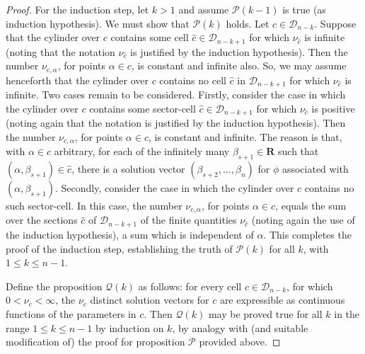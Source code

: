 \documentclass[10pt,a4paper]{amsart}
\def\R{\mathbf{ R}}
\begin{document}
\begin{proof}
    For the induction step, let $k > 1$ and assume $\mathcal{P}(k-1)$ is true
    (as induction hypothesis). We must show that $\mathcal{P}(k)$ holds.
    Let $c \in \mathcal{D}_{n-k}$.
    Suppose that the cylinder over $c$ contains some 
    cell $\hat{c} \in \mathcal{D}_{n-k+1}$ for which $\nu_{\hat{c}}$
    is infinite (noting that the notation $\nu_{\hat{c}}$
    is justified by the induction hypothesis).
    Then the number $\nu_{c, \alpha}$, for points $\alpha \in c$,
    is constant and infinite also.
    So, we may assume henceforth that the cylinder over $c$ contains
    no cell $\hat{c}$ in $\mathcal{D}_{n-k+1}$ for which $\nu_{\hat{c}}$
    is infinite. Two cases remain to be considered.
    Firstly, consider the case in which the cylinder over $c$
    contains some sector-cell $\hat{c} \in \mathcal{D}_{n-k+1}$
    for which $\nu_{\hat{c}}$ is positive
    (noting again that the notation is justified by the induction
    hypothesis). Then the number $\nu_{c, \alpha}$, for points
    $\alpha \in c$, is constant and infinite. The reason is that,
    with $\alpha \in c$ arbitrary,
    for each of the infinitely many $\beta_{s+1} \in \R$
    such that $(\alpha, \beta_{s+1}) \in \hat{c}$,
    there is a solution vector $(\beta_{s+2}, \ldots, \beta_n)$
    for $\phi$ associated with $(\alpha, \beta_{s+1})$.
    Secondly, consider the case in which the cylinder over $c$
    contains no such sector-cell. In this case, the number
    $\nu_{c, \alpha}$, for points $\alpha \in c$, equals the sum 
    over the sections $\hat{c}$ of $\mathcal{D}_{n-k+1}$
    of the finite quantities $\nu_{\hat{c}}$ (noting again the use of the
    induction hypothesis), a sum which is independent of $\alpha$.
    This completes the proof of the induction step,
    establishing the truth of $\mathcal{P}(k)$ for all $k$, with $1 \le k \le n-1$.

    Define the proposition $\mathcal{Q}(k)$ as follows:
    for every cell $c \in \mathcal{D}_{n-k}$,
    for which $0 < \nu_c < \infty$,
    the $\nu_c$ distinct solution vectors for $c$ are expressible
    as continuous functions of the parameters in $c$.
    Then $\mathcal{Q}(k)$ may be proved true for all $k$ in the range 
    $1 \le k \le n-1$ by induction on $k$,
    by analogy with (and suitable modification of)
    the proof for proposition $\mathcal{P}$ provided above.
    
\end{proof}
\end{document}
